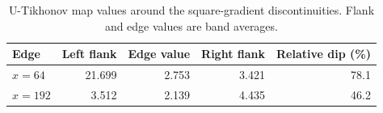 \begin{table}[htbp]
\centering
\caption{U-Tikhonov map values around the square-gradient discontinuities. Flank and edge values are band averages.}
\label{tab:square_edge_values}
\begin{tabular}{lrrrr}
\toprule
Edge & Left flank & Edge value & Right flank & Relative dip (\%) \\
\midrule
$x=64$ & 21.699 & 2.753 & 3.421 & 78.1 \\
$x=192$ & 3.512 & 2.139 & 4.435 & 46.2 \\
\bottomrule
\end{tabular}
\end{table}
